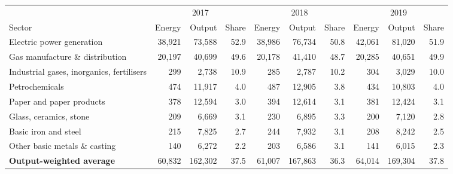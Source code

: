 \begin{tabular}[t]{lrrrrrrrrr}
\toprule
\multicolumn{1}{c}{ } & \multicolumn{3}{c}{2017} & \multicolumn{3}{c}{2018} & \multicolumn{3}{c}{2019} \\
\cmidrule(l{3pt}r{3pt}){2-4} \cmidrule(l{3pt}r{3pt}){5-7} \cmidrule(l{3pt}r{3pt}){8-10}
Sector & Energy & Output & Share & Energy & Output & Share & Energy & Output & Share\\
\midrule
Electric power generation & 38,921 & 73,588 & 52.9 & 38,986 & 76,734 & 50.8 & 42,061 & 81,020 & 51.9\\
Gas manufacture \& distribution & 20,197 & 40,699 & 49.6 & 20,178 & 41,410 & 48.7 & 20,285 & 40,651 & 49.9\\
Industrial gases, inorganics, fertilisers & 299 & 2,738 & 10.9 & 285 & 2,787 & 10.2 & 304 & 3,029 & 10.0\\
Petrochemicals & 474 & 11,917 & 4.0 & 487 & 12,905 & 3.8 & 434 & 10,803 & 4.0\\
Paper and paper products & 378 & 12,594 & 3.0 & 394 & 12,614 & 3.1 & 381 & 12,424 & 3.1\\
Glass, ceramics, stone & 209 & 6,669 & 3.1 & 230 & 6,895 & 3.3 & 200 & 7,120 & 2.8\\
Basic iron and steel & 215 & 7,825 & 2.7 & 244 & 7,932 & 3.1 & 208 & 8,242 & 2.5\\
Other basic metals \& casting & 140 & 6,272 & 2.2 & 203 & 6,586 & 3.1 & 141 & 6,015 & 2.3\\
\midrule
\textbf{Output-weighted average} & 60,832 & 162,302 & 37.5 & 61,007 & 167,863 & 36.3 & 64,014 & 169,304 & 37.8\\
\bottomrule
\end{tabular}